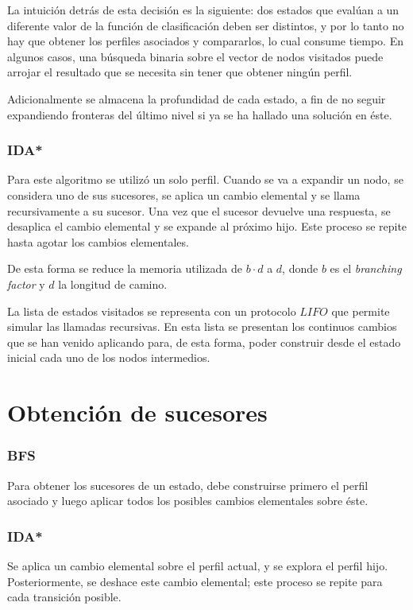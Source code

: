 \documentclass[letterpaper,12pt, titlepage]{article}
\begin{document}
La intuición detrás de esta decisión es la siguiente:
dos estados que evalúan a un diferente valor de la función de clasificación
deben ser distintos, y por lo tanto no hay que obtener los perfiles asociados
y compararlos, lo cual consume tiempo. En algunos casos, una búsqueda binaria
sobre el vector de nodos visitados puede arrojar el resultado que se necesita
sin tener que obtener ningún perfil.

Adicionalmente se almacena la profundidad de cada estado, a fin de no
seguir expandiendo fronteras del último nivel si ya se ha hallado una
solución en éste.

\subsubsection*{IDA*}

Para este algoritmo se utilizó un solo perfil. Cuando se va a expandir
un nodo, se considera uno de sus sucesores, se aplica un cambio elemental
y se llama recursivamente a su sucesor. Una vez que el sucesor devuelve
una respuesta, se desaplica el cambio elemental y se expande
al próximo hijo. Este proceso se repite hasta agotar los  cambios
elementales. 

De esta forma se reduce la memoria utilizada de $b\cdot d$ a $d$, donde
$b$ es el \textit{branching factor} y $d$ la longitud de camino. 

La lista de estados visitados se representa con un protocolo $LIFO$ que
permite simular las llamadas recursivas. En esta lista se presentan los
continuos cambios que se han venido aplicando para, de esta forma, poder
construir desde el estado inicial cada uno de los nodos intermedios.

\section{Obtención de sucesores}
\subsubsection*{BFS}
    Para obtener los sucesores de un estado, debe construirse primero
    el perfil asociado y luego aplicar todos los posibles cambios elementales
    sobre éste.

\subsubsection*{IDA*}
    Se aplica un cambio elemental sobre
    el perfil actual, y se explora el perfil hijo. Posteriormente,
    se deshace este cambio elemental; este proceso se repite para
   cada transición posible.
\end{document}
